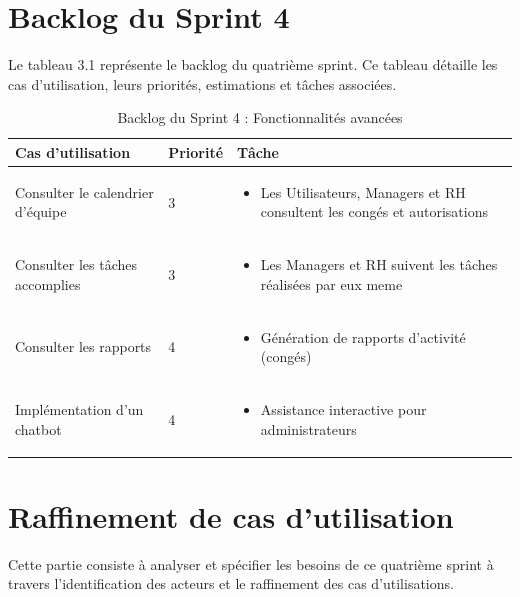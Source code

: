 \section{Backlog du Sprint 4}
Le tableau 3.1 représente le backlog du quatrième sprint. Ce tableau détaille les cas d’utilisation, leurs priorités, estimations et tâches associées.
\begin{table}[!ht]
    \begin{adjustwidth}{-3.5cm}{-3.5cm}
        \vspace{-0.2cm}
    \centering
    \caption{Backlog du Sprint 4 : Fonctionnalités avancées}
    \label{tab:backlog_sprint4}
    \begin{tabular}{ | m{5cm} | m{1cm} | m{11.5cm} | }
    \hline
    \cellcolor[rgb]{0.832,0.832,0.832}Cas d'utilisation & \cellcolor[rgb]{0.832,0.832,0.832}Priorité & \cellcolor[rgb]{0.832,0.832,0.832}Tâche \\
    \hline
    Consulter le calendrier d'équipe & 3 & 
    \begin{itemize}
        \item Les Utilisateurs, Managers et RH consultent les congés et autorisations
    \end{itemize} \\
    \hline
    Consulter les tâches accomplies & 3 & 
    \begin{itemize}
            \item Les Managers et RH suivent les tâches réalisées par eux meme
    \end{itemize} \\
    \hline
    Consulter les rapports & 4 & 
    \begin{itemize}
        \item Génération de rapports d'activité (congés)
    \end{itemize} \\
    \hline
    Implémentation d'un chatbot & 4 & 
    \begin{itemize}
        \item Assistance interactive pour administrateurs
    \end{itemize} \\
    \hline
    \end{tabular}
    \end{adjustwidth}
\end{table}
\newpage    
\section{Raffinement de cas d'utilisation}
Cette partie consiste à analyser et spécifier les besoins de ce quatrième sprint à travers l’identification des acteurs et le raffinement des cas d’utilisations.

